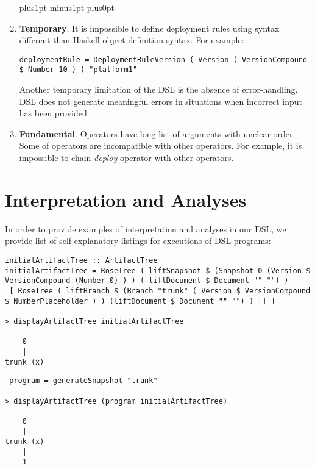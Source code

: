 \documentclass[11pt]{article}
\def\denseitems{
    \itemsep1pt plus1pt minus1pt
    \parsep0pt plus0pt
    \parskip0pt\topsep0pt}
\newcommand{\RevisionNeeded}{\bigskip\noindent\fbox{
\textbf{Be prepared to revise this section \emph{many} times!}}}
\begin{document}
\begin{enumerate}[(1)]\denseitems
\item \textbf{Temporary}. It is impossible to define deployment rules using syntax different than Haskell object definition syntax. For example: 
\begin{lstlisting}[style=Haskell]
deploymentRule = DeploymentRuleVersion ( Version ( VersionCompound $ Number 10 ) ) "platform1" 
\end{lstlisting}
Another temporary limitation of the DSL is the absence of error-handling. DSL does not generate meaningful errors in situations when incorrect input has been provided. 
\item \textbf{Fundamental}. Operators have long list of arguments with unclear order. Some of operators are incompatible with other operators. For example, it is impossible to chain \emph{deploy} operator with other operators. 
\end{enumerate}


%
%




\section{Interpretation and Analyses}
\label{sec:analysis}
In order to provide examples of interpretation and analyses in our DSL, we provide list of self-explanatory listings for executions of DSL programs: 
\begin{lstlisting}
initialArtifactTree :: ArtifactTree 
initialArtifactTree = RoseTree ( liftSnapshot $ (Snapshot 0 (Version $  VersionCompound (Number 0) ) ) ( liftDocument $ Document "" "") ) 
 [ RoseTree ( liftBranch $ (Branch "trunk" ( Version $ VersionCompound $ NumberPlaceholder ) ) (liftDocument $ Document "" "") ) [] ]
 
> displayArtifactTree initialArtifactTree 

    0    
    |    
trunk (x)
 \end{lstlisting}
 \begin{lstlisting}
 program = generateSnapshot "trunk" 
 
> displayArtifactTree (program initialArtifactTree)
 
    0    
    |    
trunk (x)
    |    
    1   
 
 \end{lstlisting}
 
\end{document}
